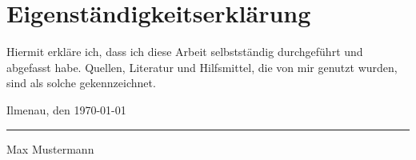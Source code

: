 \cleardoublepage
{}
\chapter*{Eigenständigkeitserklärung}
\begin{spacing}{1.1}
Hiermit erkläre ich, dass ich diese Arbeit selbstständig durchgeführt und abgefasst habe. Quellen, Literatur und Hilfsmittel, die von mir genutzt wurden, sind als solche
gekennzeichnet.
\\[2cm]
\end{spacing}
\noindent Ilmenau, den \today\hfill
\\[2cm]
\parbox{4cm}{\centering \hrule
	\strut \centering\footnotesize Max Mustermann}
\\[2cm]
    
\cleardoublepage